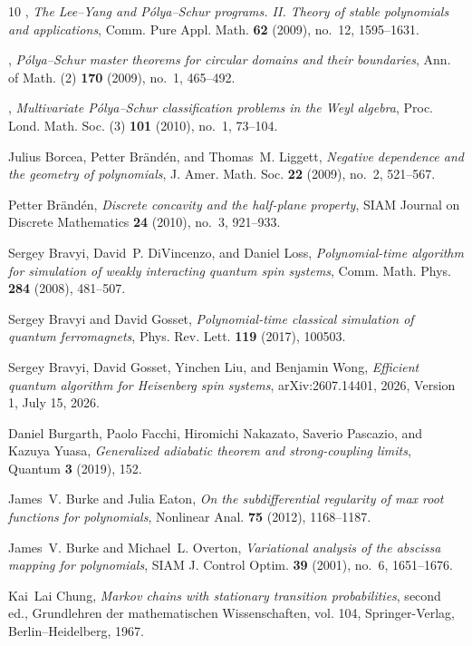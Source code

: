 \documentclass[reqno]{amsart}
\theoremstyle{definition}
\theoremstyle{remark}
\begin{document}
\begin{thebibliography}{10}
\bysame, \emph{The {Lee--Yang} and {P{\'o}lya--Schur} programs. {II}. {Theory}
  of stable polynomials and applications}, Comm. Pure Appl. Math. \textbf{62}
  (2009), no.~12, 1595--1631.

\bysame, \emph{{P{\'o}lya--Schur} master theorems for circular domains and
  their boundaries}, Ann. of Math. (2) \textbf{170} (2009), no.~1, 465--492.

\bysame, \emph{Multivariate {P{\'o}lya--Schur} classification problems in the
  {Weyl} algebra}, Proc. Lond. Math. Soc. (3) \textbf{101} (2010), no.~1,
  73--104.

Julius Borcea, Petter Br{\"a}nd{\'e}n, and Thomas~M. Liggett, \emph{Negative
  dependence and the geometry of polynomials}, J. Amer. Math. Soc. \textbf{22}
  (2009), no.~2, 521--567.

Petter Br{\"a}nd{\'e}n, \emph{Discrete concavity and the half-plane property},
  SIAM Journal on Discrete Mathematics \textbf{24} (2010), no.~3, 921--933.

Sergey Bravyi, David~P. DiVincenzo, and Daniel Loss, \emph{Polynomial-time
  algorithm for simulation of weakly interacting quantum spin systems}, Comm.
  Math. Phys. \textbf{284} (2008), 481--507.

Sergey Bravyi and David Gosset, \emph{Polynomial-time classical simulation of
  quantum ferromagnets}, Phys. Rev. Lett. \textbf{119} (2017), 100503.

Sergey Bravyi, David Gosset, Yinchen Liu, and Benjamin Wong, \emph{Efficient
  quantum algorithm for {Heisenberg} spin systems}, arXiv:2607.14401, 2026,
  Version 1, July 15, 2026.

Daniel Burgarth, Paolo Facchi, Hiromichi Nakazato, Saverio Pascazio, and Kazuya
  Yuasa, \emph{Generalized adiabatic theorem and strong-coupling limits},
  Quantum \textbf{3} (2019), 152.

James~V. Burke and Julia Eaton, \emph{On the subdifferential regularity of max
  root functions for polynomials}, Nonlinear Anal. \textbf{75} (2012),
  1168--1187.

James~V. Burke and Michael~L. Overton, \emph{Variational analysis of the
  abscissa mapping for polynomials}, SIAM J. Control Optim. \textbf{39} (2001),
  no.~6, 1651--1676.

Kai~Lai Chung, \emph{Markov chains with stationary transition probabilities},
  second ed., Grundlehren der mathematischen Wissenschaften, vol. 104,
  Springer-Verlag, Berlin--Heidelberg, 1967.


\end{thebibliography}
\end{document}
